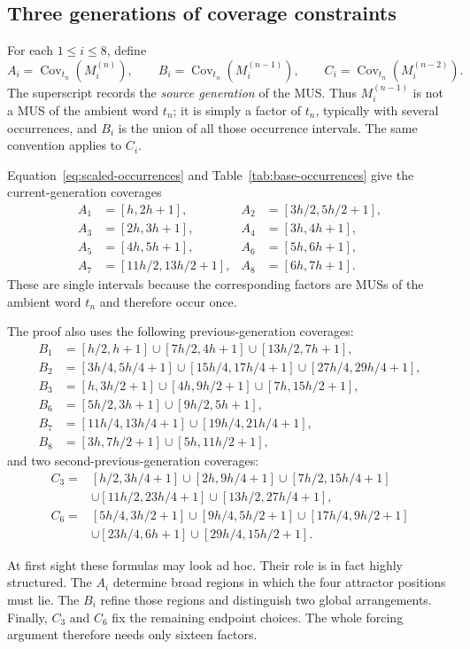 \documentclass[10pt,a4paper]{article}
\theoremstyle{definition}\newtheorem{definition}[theorem]{Definition}
\theoremstyle{remark}\newtheorem{remark}[theorem]{Remark}
\newcommand{\Cov}{\operatorname{Cov}}
\begin{document}
\subsection{Three generations of coverage constraints}
\label{subsec:ABC-coverages}

For each $1\le i\le8$, define
\[
 A_i=\Cov_{t_n}(M_i^{(n)}),\qquad
 B_i=\Cov_{t_n}(M_i^{(n-1)}),\qquad
 C_i=\Cov_{t_n}(M_i^{(n-2)}).
\]
The superscript records the \emph{source generation} of the MUS.  Thus $M_i^{(n-1)}$ is not a MUS of the ambient word $t_n$; it is simply a factor of $t_n$, typically with several occurrences, and $B_i$ is the union of all those occurrence intervals.  The same convention applies to $C_i$.

Equation~\eqref{eq:scaled-occurrences} and Table~\ref{tab:base-occurrences} give the current-generation coverages
\begin{align*}
A_1&=[h,2h+1], & A_2&=[3h/2,5h/2+1],\\
A_3&=[2h,3h+1], & A_4&=[3h,4h+1],\\
A_5&=[4h,5h+1], & A_6&=[5h,6h+1],\\
A_7&=[11h/2,13h/2+1], & A_8&=[6h,7h+1].
\end{align*}
These are single intervals because the corresponding factors are MUSs of the ambient word $t_n$ and therefore occur once.

The proof also uses the following previous-generation coverages:
\begin{align*}
B_1&=[h/2,h+1]\cup[7h/2,4h+1]\cup[13h/2,7h+1],\\
B_2&=[3h/4,5h/4+1]\cup[15h/4,17h/4+1]\cup[27h/4,29h/4+1],\\
B_3&=[h,3h/2+1]\cup[4h,9h/2+1]\cup[7h,15h/2+1],\\
B_6&=[5h/2,3h+1]\cup[9h/2,5h+1],\\
B_7&=[11h/4,13h/4+1]\cup[19h/4,21h/4+1],\\
B_8&=[3h,7h/2+1]\cup[5h,11h/2+1],
\end{align*}
and two second-previous-generation coverages:
\begin{align*}
C_3={}&[h/2,3h/4+1]\cup[2h,9h/4+1]\cup[7h/2,15h/4+1]\\
&\cup[11h/2,23h/4+1]\cup[13h/2,27h/4+1],\\
C_6={}&[5h/4,3h/2+1]\cup[9h/4,5h/2+1]\cup[17h/4,9h/2+1]\\
&\cup[23h/4,6h+1]\cup[29h/4,15h/2+1].
\end{align*}

At first sight these formulas may look ad hoc.  Their role is in fact highly structured.  The $A_i$ determine broad regions in which the four attractor positions must lie.  The $B_i$ refine those regions and distinguish two global arrangements.  Finally, $C_3$ and $C_6$ fix the remaining endpoint choices.  The whole forcing argument therefore needs only sixteen factors.
\end{document}
